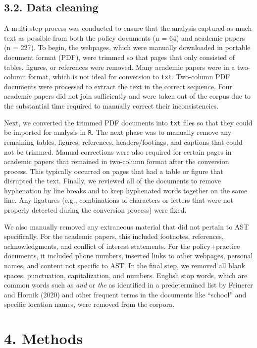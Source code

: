 \documentclass[]{elsarticle} %
\begin{document}
\hypertarget{data-cleaning}{%
\subsection{3.2. Data cleaning}\label{data-cleaning}}

A multi-step process was conducted to ensure that the analysis captured
as much text as possible from both the policy documents (n = 64) and
academic papers (n = 227). To begin, the webpages, which were manually
downloaded in portable document format (PDF), were trimmed so that pages
that only consisted of tables, figures, or references were removed. Many
academic papers were in a two-column format, which is not ideal for
conversion to \texttt{txt}. Two-column PDF documents were processed to
extract the text in the correct sequence. Four academic papers did not
join sufficiently and were taken out of the corpus due to the
substantial time required to manually correct their inconsistencies.

Next, we converted the trimmed PDF documents into \texttt{txt} files so
that they could be imported for analysis in \texttt{R}. The next phase
was to manually remove any remaining tables, figures, references,
headers/footings, and captions that could not be trimmed. Manual
corrections were also required for certain pages in academic papers that
remained in two-column format after the conversion process. This
typically occurred on pages that had a table or figure that disrupted
the text. Finally, we reviewed all of the documents to remove
hyphenation by line breaks and to keep hyphenated words together on the
same line. Any ligatures (e.g., combinations of characters or letters
that were not properly detected during the conversion process) were
fixed.

We also manually removed any extraneous material that did not pertain to
AST specifically. For the academic papers, this included footnotes,
references, acknowledgments, and conflict of interest statements. For
the policy+practice documents, it included phone numbers, inserted links
to other webpages, personal names, and content not specific to AST. In
the final step, we removed all blank spaces, punctuation,
capitalization, and numbers. English stop words, which are common words
such as \emph{and} or \emph{the} as identified in a predetermined list
by Feinerer and Hornik (2020) and other frequent terms in the documents
like ``school'' and specific location names, were removed from the
corpora.

\hypertarget{methods}{%
\section{4. Methods}\label{methods}}
\end{document}
